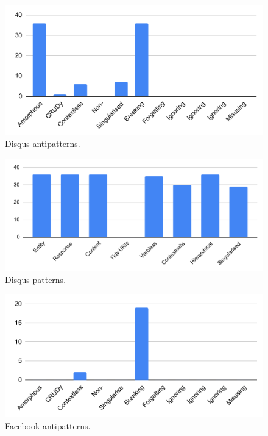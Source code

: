 \documentclass[a4paper,12pt]{article}
\begin{document}
\begin{figure}[!h]
\begin{center}
\includegraphics[keepaspectratio,scale=0.8]{Template_report_LaTeX_EN/img/barchart/disqusBarAnti.pdf}
\caption{Disqus antipatterns.}
\label{fig:disqusBarAnti}
\end{center}
\end{figure}

\begin{figure}[!h]
\begin{center}
\includegraphics[keepaspectratio,scale=0.8]{Template_report_LaTeX_EN/img/barchart/disqusBarPatt.pdf}
\caption{Disqus patterns.}
\label{fig:disqusBarPatt}
\end{center}
\end{figure}

\begin{figure}[!h]
\begin{center}
\includegraphics[keepaspectratio,scale=0.8]{Template_report_LaTeX_EN/img/barchart/facebookBarAnti.pdf}
\caption{Facebook antipatterns.}
\label{fig:facebookBarAnti}
\end{center}
\end{figure}
\end{document}
